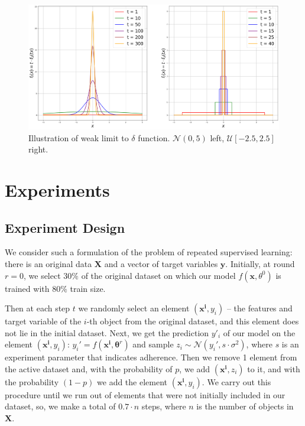 \documentclass{article}
\begin{document}
    \begin{figure}[h!]
        \centering
        \includegraphics[width = 0.99\linewidth]{pictures/example1.png}
        \caption{Illustration of weak limit to $\delta$ function. $\mathcal{N}(0, 5)$ left, $\mathcal{U}[-2.5, 2.5]$ right.}
        \label{example1}
    \end{figure}

    

    


    

\section{Experiments} \label{Experiments}

    \subsection{Experiment Design} \label{design}
        We consider such a formulation of the problem of repeated supervised learning: there is an original data $\textbf{X}$ and a vector of target variables $\mathbf{y}$. Initially, at round $r = 0$, we select $30\%$ of the original dataset on which our model $f(\mathbf{x}, \theta^0)$ is trained with $80\%$ train size. 
        
        Then at each step $t$ we randomly select an element $(\mathbf{x^i}, y_i)$ -- the features and target variable of the $i$-th object from the original dataset, and this element does not lie in the initial dataset. Next, we get the prediction $y'_i$ of our model on the element $(\mathbf{x^i}, y_i)$: $y_i'=f(\mathbf{x^i}, \mathbf{\theta}^r)$ and sample $z_i \sim \mathcal{N}(y_i', s \cdot \sigma^2)$, where $s$ is an experiment parameter that indicates adherence. Then we remove 1 element from the active dataset and, with the probability of $p$, we add $(\mathbf{x^i}, z_i)$ to it, and with the probability $(1-p)$ we add the element $(\mathbf{x^i}, y_i)$. We carry out this procedure until we run out of elements that were not initially included in our dataset, so, we make a total of $0.7 \cdot n$ steps, where $n$ is the number of objects in $\textbf{X}$.
\end{document}
